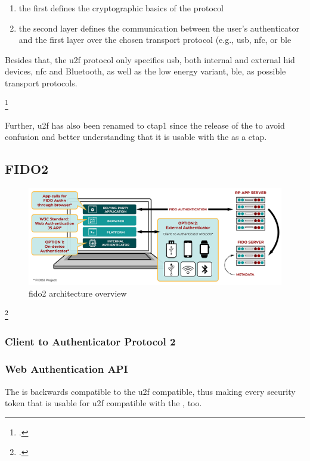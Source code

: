 \begin{enumerate}
	\item the first defines the cryptographic basics of the protocol
	\item the second layer defines the communication between the user's authenticator and the first layer over the chosen transport protocol (e.g., \gls{usb}, \gls{nfc}, or \gls{ble}
\end{enumerate}

Besides that, the \gls{u2f} protocol only specifies \gls{usb}, both internal and external \gls{hid} devices, \gls{nfc} and Bluetooth, as well as the low energy variant, \gls{ble}, as possible transport protocols.

\footcites[See][1--2, 4]{u2f-overview}[See][4]{u2f-js-api}

Further, \gls{u2f} has also been renamed to \gls{ctap}1 since the release of the \wa{} to avoid confusion and better understanding that it is usable with the \wa{} as a \gls{ctap}.

\subsection{FIDO2}

\begin{figure}[hbt]
	\centering
	\includegraphics[width=\textwidth]{pics/FIDO2-Graphic-v2}
	\caption[\gls{fido}2 architecture overview]{\gls{fido}2 architecture overview\footnotemark}
	\label{fig:fido2_architecture}
\end{figure}
\footcitetext[Source: https://fidoalliance.org/specifications/][4]{uaf-overview}


\subsubsection{Client to Authenticator Protocol 2}

\subsubsection{Web Authentication API}

The \wa{} is backwards compatible to the \gls{u2f} compatible, thus making every security token that is usable for \gls{u2f} compatible with the \wa, too.